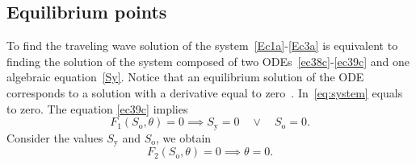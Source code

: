 {	%
}
\textcolor{blue}{
}
\subsection{Equilibrium points}

To find the traveling wave solution of the system~\eqref{Ec1a}-\eqref{Ec3a}
is equivalent to finding the solution of the system composed of two ODEs~\eqref{ec38c}-\eqref{ec39c}
and one algebraic equation~\eqref{Sy}.
Notice that an equilibrium solution of the ODE corresponds to a solution with a derivative equal to
zero~\cite{guckenheimer2013nonlinear,sotomayor1979liccoes}.
In~\eqref{eq:system} equals to zero.
The equation \eqref{ec39c} implies
\begin{equation*}
	F_{1}\left(S_{\text{o}},\theta\right)=0\implies
	S_{\text{y}}=0\quad\vee\quad
	S_{\text{o}}=0.
\end{equation*}
Consider the values $S_{\text{y}}$ and $S_{\text{o}}$, we obtain
\begin{equation*}
	F_{2}\left(S_{\text{o}},\theta\right)=0\implies
	\theta=0.
\end{equation*}

